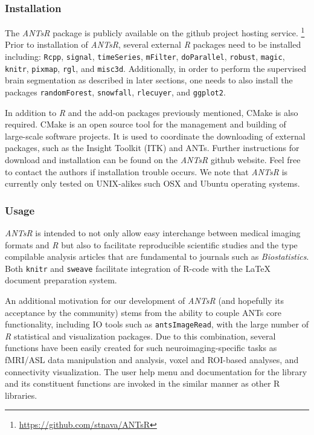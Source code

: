 \documentclass[preprint,authoryear,review,12pt]{elsarticle}
\begin{document}
\subsubsection{Installation}

The \textit{ANTsR} package is publicly available on the github project hosting service.%
\footnote{
\href{https://github.com/stnava/ANTsR}{https://github.com/stnava/ANTsR}
}
Prior to installation of \textit{ANTsR}, several external \textit{R} packages
need to be installed including: \verb#Rcpp#, \verb#signal#, \verb#timeSeries#, 
\verb#mFilter#, \verb#doParallel#, \verb#robust#, \verb#magic#, \verb#knitr#, \verb#pixmap#, 
\verb#rgl#, and \verb#misc3d#.
Additionally, in order
to perform the supervised brain segmentation as described 
in later sections, one needs to also install the packages
\verb#randomForest#, \verb#snowfall#, \verb#rlecuyer#,
and \verb#ggplot2#.

In addition to \textit{R} and the add-on packages previously mentioned, CMake is also 
required.  CMake
is an open source tool for the management and building of 
large-scale software projects.  It is used
to coordinate the downloading of external packages,
such as the Insight Toolkit (ITK)
and ANTs.  Further instructions for download and
installation can be found on the \textit{ANTsR} github website.  Feel
free to contact the authors if installation trouble occurs.  We note
that \textit{ANTsR} is currently only tested on UNIX-alikes such OSX and Ubuntu
operating systems.

\subsubsection{Usage}
\textit{ANTsR} is intended to not only allow easy interchange between
medical imaging formats and \textit{R} but also to facilitate
reproducible scientific studies and the type compilable analysis
articles that are fundamental to journals such as
\textit{Biostatistics}.  Both \verb#knitr# and \verb#sweave#
facilitate integration of R-code with the LaTeX document
preparation system.  

An additional motivation for our development of \textit{ANTsR} (and
hopefully its acceptance by the community) 
stems from the ability to couple ANTs core 
functionality, including IO tools such as \verb#antsImageRead#, 
with the large number of \textit{R} statistical and
visualization packages.  Due to this combination, several
functions have been easily created for such neuroimaging-specific 
tasks as fMRI/ASL data manipulation and analysis,
voxel and ROI-based  analyses,
and connectivity visualization. %
The user help menu and documentation for the library  and its
constituent functions are invoked in the similar manner as other
R libraries.
\end{document}
